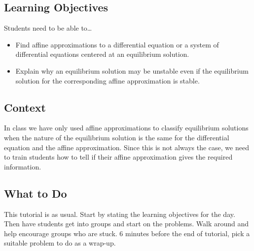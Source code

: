 \subsection*{Learning Objectives}
Students need to be able to\ldots
\begin{itemize}
	\item Find affine approximations to a differential equation or a system of differential equations centered
	      at an equilibrium solution.
	\item Explain why an equilibrium solution may be unstable even if the equilibrium solution
	      for the corresponding affine approximation is stable.
\end{itemize}

\subsection*{Context}

In class we have only used affine approximations to classify equilibrium solutions when the
nature of the equilibrium solution is the same for the differential equation and the affine approximation.
Since this is not always the case, we need to train students how to tell if their affine approximation
gives the required information.


\subsection*{What to Do}

This tutorial is as usual. Start by stating the learning objectives for the day. Then have students
get into groups and start on the problems. Walk around and help encourage groups who are stuck.
6 minutes before the end of tutorial, pick a suitable problem to do as a wrap-up.

